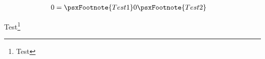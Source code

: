 \begin{psxFootenv}
    \begin{align*}
        0&=\psxFootnote{Test 1} 0\psxFootnote{Test 2}
    \end{align*}
\end{psxFootenv}

Test\footnote{Test}